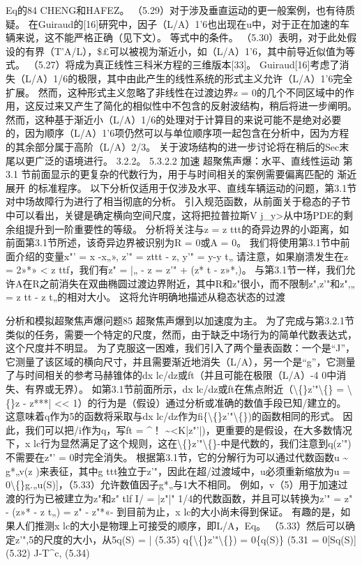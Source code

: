 \documentclass[UTF8,11pt,a4paper,openany,fontset=fandol]{ctexbook}
\begin{document}
Eq的84 CHENG和HAFEZ。 （5.29）对于涉及垂直运动的更一般案例，也有待质疑。 在Guiraud的[16]研究中，因子（L/A）1'6也出现在u中，对于正在加速的车辆来说，这不能严格正确（见下文）。 等式中的条件。 （5.30）表明，对于此处假设的有界（T'A/L），\$£可以被视为渐近小，如（L/A）1'6，其中前导近似值为等式。 （5.27）将成为真正线性三科米方程的三维版本[33]。 Guiraud[16]考虑了消失（L/A）1/6的极限，其中由此产生的线性系统的形式主义允许（L/A）1'6完全扩展。 然而，这种形式主义忽略了非线性在过渡边界z = 0的几个不同区域中的作用，这反过来又产生了简化的相似性中不包含的反射波结构，稍后将进一步阐明。 然而，这种基于渐近小（L/A）1/6的处理对于计算目的来说可能不是绝对必要的，因为顺序（L/A）1'6项仍然可以与单位顺序项一起包含在分析中，因为方程的其余部分属于高阶（L/A）2/3。 关于波场结构的进一步讨论将在稍后的Sec末尾以更广泛的语境进行。 3.2.2。 5.3.2.2 加速 超聚焦声爆：水平、直线性运动 第 3.1 节前面显示的更复杂的代数行为，用于与时间相关的案例需要偏离匹配的 渐近展开 的标准程序。 以下分析仅适用于仅涉及水平、直线车辆运动的问题，第3.1节对中场故障行为进行了相当彻底的分析。 引入规范函数，从前面关于稳态的子节中可以看出，关键是确定横向空间尺度，这将把拉普拉斯V j\_y>从中场PDE的剩余组提升到一阶重要性的等级。 分析将关注与z = z ttt的奇异边界的小距离，如前面第3.1节所述，该奇异边界被识别为R = 0或A = 0。 我们将使用第3.1节中前面介绍的变量x"' = x -x„», z'" = zttt - z, y'" = y-y t„ 请注意，如果崩溃发生在z = 2»*» < z ttf，我们有z" = |„ - z = z'" + (z* t - z»*,)。 与第3.1节一样，我们允许A在R之前消失在双曲椭圆过渡边界附近，其中R和z"很小，而不限制z",z'"和z",„ = z tt - z t„的相对大小。 这将允许明确地描述从稳态状态的过渡

分析和模拟超聚焦声爆问题85 超聚焦声爆到以加速度为主。 为了完成与第3.2.1节类似的任务，需要一个特定的尺度，然而，由于缺乏中场行为的简单代数表达式，这个尺度并不明显。 为了克服这一困难，我们引入了两个量表函数：一个是“J”，它测量了该区域的横向尺寸，并且需要渐近地消失（L/A），另一个是“g”，它测量了与时间相关的参考马赫锥体的dx lc/dz或ft（并且可能在极限（L/A）-4 0中消失、有界或无界）。 如第3.1节前面所示，dx lc/dz或ft在焦点附近（\textbackslash\{\}z'"\textbackslash\{\} = \textbackslash\{\}z - z***| << 1）的行为是（假设）通过分析或准确的数值手段已知/建立的。 这意味着q作为5的函数将采取与dx lc/dz作为fi\{\textbackslash\{\}z'"\textbackslash\{\})的函数相同的形式。 因此，我们可以把/i作为q，写ft = \textasciicircum{}！ \textasciitilde{}<K|z"'|)，更重要的是假设，在大多数情况下，x lc行为显然满足了这个规则，这在\textbackslash\{\}z'"\textbackslash\{\}-中是代数的，我们注意到q(z'")不需要在z"' = 0时完全消失。 根据第3.1节，它的分解行为可以通过代数函数u \textasciitilde{} g*„v(z )来表征，其中g ttt独立于z'"，因此在超/过渡域中，u必须重新缩放为u = 0\textbackslash\{\}g.„u(S)]，（5.33）允许数值因子g*„与1大不相同。 例如，v（5）用于加速过渡的行为已被建立为z"和z" tlf I/ = |z"|" 1/4的代数函数，并且可以转换为z'" = z" - (z»* - z t„) = z" - z"*«- 到目前为止，x lc的大小尚未得到保证。 有趣的是，如果人们推测x lc的大小是物理上可接受的顺序，即L/A，Eq。 （5.33）然后可以确定z'",5的尺度的大小，从5q(S) = | (5.35) q\{\textbackslash\{\}z'"\textbackslash\{\}) = 0\{q(S)\} (5.31 = 0[Sq(S)] (5.32) J-T\textasciicircum{}c, (5.34)
\end{document}
